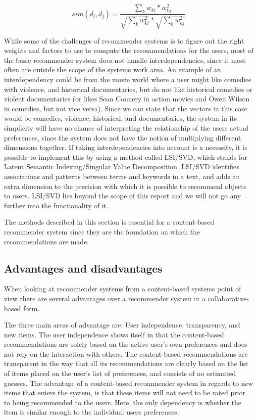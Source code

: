 \[
	sim({d_{i},d_{j}}) = \frac{\sum_{k}w_{ki}*w_{kj}^2}{\sqrt{\sum_{k}w_{ki}^2}*\sqrt{\sum_{k}w_{kj}^2}}
\]


While some of the challenges of recommender systems is to figure out the right weights and factors to use to compute the recommendations for the users, most of the basic recommender system does not handle interdependencies, since it most often are outside the scope of the systems work area.\newline
An example of an interdependency could be from the movie world where a user might like comedies with violence, and historical documentaries, but do not like historical comedies or violent documentaries (or likes Sean Connery in action movies and Owen Wilson in comedies, but not vice versa). \newline
Since we can state that the vectors in this case would be comedies, violence, historical, and documentaries, the system in its simplicity will have no chance of interpreting the relationship of the users actual preferences, since the system does not have the notion of multiplying different dimensions together. If taking interdependencies into account is a necessity, it is possible to implement this by using a method called LSI/SVD, which stands for Latent Semantic Indexing/Singular Value Decomposition. LSI/SVD identifies associations and patterns between terms and keywords in a text, and adds an extra dimension to the precision with which it is possible to recommend objects to users. LSI/SVD lies beyond the scope of this report and we will not go any further into the functionality of it.\newline

The methods described in this section is essential for a content-based recommender system since they are the foundation on which the recommendations are made.

\subsection{Advantages and disadvantages}
When looking at recommender systems from a content-based systems point of view there are several advantages over a recommender system in a collaborative-based form.\newline

The three main areas of advantage are: User independence, transparency, and new items.\newline
The user independence shows itself in that the content-based recommendations are solely based on the active user's own preferences and does not rely on the interaction with others.\newline
The content-based recommendations are transparent in the way that all its recommendations are clearly based on the list of items placed on the user's list of preferences, and consists of no estimated guesses.\newline
The advantage of a content-based recommender system in regards to new items that enters the system, is that these items will not need to be rated prior to being recommended to the users. Here, the only dependency is whether the item is similar enough to the individual users preferences.\newline

